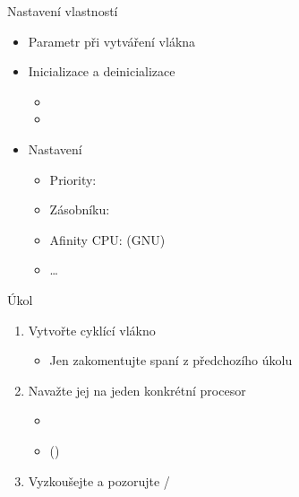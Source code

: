 \begin{frame}{Nastavení vlastností}

  \begin{itemize}
    \item Parametr  při vytváření vlákna

    \pause

    \item Inicializace a deinicializace 
    \begin{itemize}
      \item {}
      \item {}
    \end{itemize}

    \pause

    \item Nastavení
    \begin{itemize}
      \item Priority: 
      \item Zásobníku: 
      \item Afinity CPU:  (GNU)
      \item \dots
    \end{itemize}
  \end{itemize}

\end{frame}

\begin{frame}{Úkol}

  \begin{enumerate}
    \item Vytvořte cyklící vlákno
    \begin{itemize}
      \item Jen zakomentujte spaní z předchozího úkolu
    \end{itemize}

    \item Navažte jej na jeden konkrétní procesor
    \begin{itemize}
      \item {}
      \item {} ()
    \end{itemize}

    \item Vyzkoušejte a pozorujte /
  \end{enumerate}

\end{frame}

